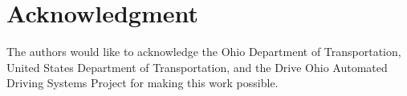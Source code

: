 \documentclass[journal,onecolumn]{IEEEtran}
\begin{document}


\justifying
\section*{Acknowledgment}


	{The authors would like to acknowledge the Ohio Department of Transportation, United States Department of Transportation, and the Drive Ohio Automated Driving Systems Project for making this work possible.}


\ifCLASSOPTIONcaptionsoff
\newpage
\fi





%
%
%


	  
	 





\end{document}
